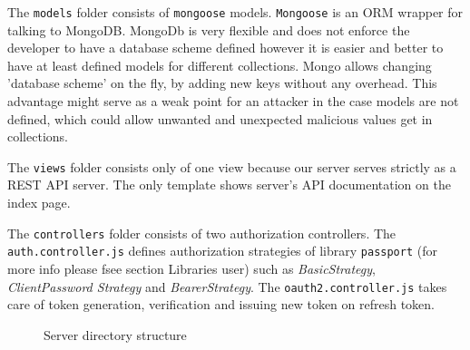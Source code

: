 \documentclass[thesis=M,english]{FITthesis}[2012/10/20]
\begin{document}
The \verb|models| folder consists of \verb|mongoose| models. \verb|Mongoose| is an ORM wrapper for talking to MongoDB. MongoDb is very flexible and does not enforce the developer to have a database scheme defined however it is easier and better to have at least defined models for different collections. Mongo allows changing 'database scheme' on the fly, by adding new keys without any overhead. This advantage might serve as a weak point for an attacker in the case models are not defined, which could allow unwanted and unexpected malicious values get in collections.

The \verb|views| folder consists only of one view because our server serves strictly as a REST API server. The only template shows server's API documentation on the index page.

The \verb|controllers| folder consists of two authorization controllers. The \verb|auth.controller.js| defines authorization strategies of library \verb|passport| (for more info please fsee section Libraries user) such as \textit{BasicStrategy}, \textit{ClientPassword Strategy} and \textit{BearerStrategy}. The \verb|oauth2.controller.js| takes care of token generation, verification and issuing new token on refresh token.

\begin{figure}
	\caption{Server directory structure}	
	\label{fig:server_dir}
\end{figure}
\end{document}
